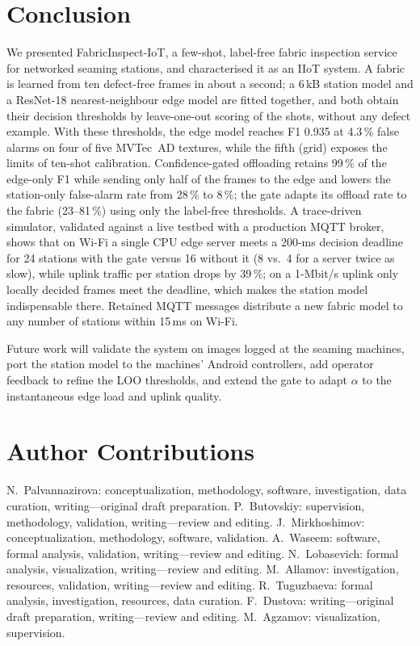 \section{Conclusion}\label{sec:conclusion}
We presented FabricInspect-IoT, a few-shot, label-free fabric inspection service for networked seaming stations, and characterised it as an IIoT system. A fabric is learned from ten defect-free frames in about a second; a 6\,kB station model and a ResNet-18 nearest-neighbour edge model are fitted together, and both obtain their decision thresholds by leave-one-out scoring of the shots, without any defect example. With these thresholds, the edge model reaches F1 0.935 at 4.3\,\% false alarms on four of five MVTec~AD textures, while the fifth (grid) exposes the limits of ten-shot calibration. Confidence-gated offloading retains 99\,\% of the edge-only F1 while sending only half of the frames to the edge and lowers the station-only false-alarm rate from 28\,\% to 8\,\%; the gate adapts its offload rate to the fabric (23--81\,\%) using only the label-free thresholds. A trace-driven simulator, validated against a live testbed with a production MQTT broker, shows that on Wi-Fi a single CPU edge server meets a 200-ms decision deadline for 24 stations with the gate versus 16 without it (8 vs.\ 4 for a server twice as slow), while uplink traffic per station drops by 39\,\%; on a 1-Mbit/s uplink only locally decided frames meet the deadline, which makes the station model indispensable there. Retained MQTT messages distribute a new fabric model to any number of stations within 15\,ms on Wi-Fi.

Future work will validate the system on images logged at the seaming machines, port the station model to the machines' Android controllers, add operator feedback to refine the LOO thresholds, and extend the gate to adapt $\alpha$ to the instantaneous edge load and uplink quality.

\section*{Author Contributions}
N.~Palvannazirova: conceptualization, methodology, software, investigation, data curation, writing---original draft preparation. P.~Butovskiy: supervision, methodology, validation, writing---review and editing. J.~Mirkhoshimov: conceptualization, methodology, software, validation. A.~Waseem: software, formal analysis, validation, writing---review and editing. N.~Lobasevich: formal analysis, visualization, writing---review and editing. M.~Allamov: investigation, resources, validation, writing---review and editing. R.~Tuguzbaeva: formal analysis, investigation, resources, data curation. F.~Dustova: writing---original draft preparation, writing---review and editing. M.~Agzamov: visualization, supervision.

